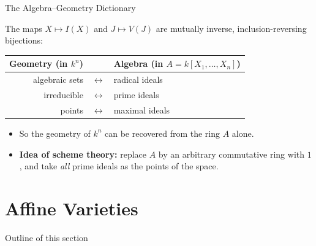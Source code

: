 \documentclass[8pt]{beamer}
\theoremstyle{definition}
\begin{document}
    \begin{frame}{The Algebra--Geometry Dictionary}
        \begin{corollary}
            The maps $X \mapsto I(X)$ and $J \mapsto V(J)$ are mutually inverse, inclusion-reversing bijections:
            \begin{center}
                \upshape
                \begin{tabular}{rcl}
                    \toprule
                    \textbf{Geometry} (in $k^n$) & & \textbf{Algebra} (in $A = k[X_1,\ldots,X_n]$) \\
                    \midrule
                    algebraic sets & $\longleftrightarrow$ & radical ideals \\
                    irreducible & $\longleftrightarrow$ & prime ideals \\
                    points & $\longleftrightarrow$ & maximal ideals \\
                    \bottomrule
                \end{tabular}
            \end{center}
        \end{corollary}
        \begin{itemize}
            \item So the geometry of $k^n$ can be recovered from the ring $A$ alone.
            \item \textbf{Idea of scheme theory:} replace $A$ by an arbitrary commutative ring with $1$, and take \emph{all} prime ideals as the points of the space.
        \end{itemize}
    \end{frame}

    \section{Affine Varieties}

    \begin{frame}{Outline of this section}
        
    \end{frame}
\end{document}
